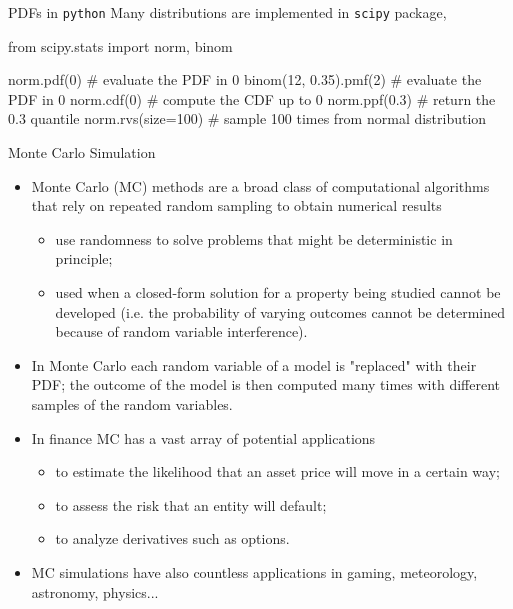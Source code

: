 \documentclass{beamer}
\begin{document}
\begin{frame}[fragile]{PDFs in \texttt{python}}
    Many distributions are implemented in \texttt{scipy} package,
\begin{ipython}
from scipy.stats import norm, binom
     
norm.pdf(0)                 # evaluate the PDF in 0
binom(12, 0.35).pmf(2)      # evaluate the PDF in 0
norm.cdf(0)                 # compute the CDF up to 0
norm.ppf(0.3)               # return the 0.3 quantile
norm.rvs(size=100)          # sample 100 times from normal distribution
\end{ipython}
\end{frame}

\begin{frame}{Monte Carlo Simulation}
    \begin{itemize}
    \item Monte Carlo (MC) methods are a broad class of computational algorithms that rely on repeated random sampling to obtain numerical results
    \begin{itemize}
        \item use randomness to solve problems that might be deterministic in principle;
        \item used when a closed-form solution for a property being studied cannot be developed (i.e. the probability of varying outcomes cannot be determined because of random variable interference). 
     \end{itemize}
    \item In Monte Carlo each random variable of a model is "replaced" with their PDF; the outcome of the model is then computed many times with different samples of the random variables. 
    \item In finance MC has a vast array of potential applications
    \begin{itemize}
        \item to estimate the likelihood that an asset price will move in a certain way;
        \item to assess the risk that an entity will default;
        \item to analyze derivatives such as options.
     \end{itemize}
    \item MC simulations have also countless applications in gaming, meteorology, astronomy, physics...
    \end{itemize}
\end{frame}
\end{document}
